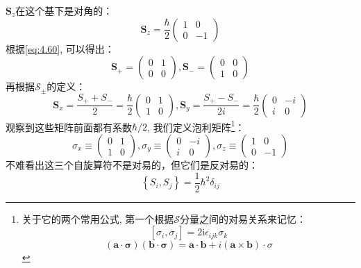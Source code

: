 \documentclass[a4paper,zihao=-4,linespread=1]{ctexrep}
\newenvironment{lequation}{\large\begin{equation}}{\end{equation}}
\begin{document}
    $\mathbf{S}_z$在这个基下是对角的：
    \begin{equation}
    \mathbf{S}_z = \frac{\hbar }{2} \begin{pmatrix}
        1& 0\\
        0& -1
    \end{pmatrix}
    \end{equation}
    根据\ref{eq:4.60}, 可以得出：
    \begin{equation}
        \mathbf{S}_+=\begin{pmatrix}
            0&1\\
            0&0
        \end{pmatrix},
        \mathbf{S}_-=\begin{pmatrix}
            0&0\\
            1&0
        \end{pmatrix}
    \end{equation}
    再根据$\mathcal{S}_\pm$的定义：
    \begin{equation}
        \mathbf{S}_x=\frac{S_++S_-}{2}=\frac{\hbar}{2}
        \begin{pmatrix}
            0&1\\
            1&0
        \end{pmatrix},
        \mathbf{S}_y=\frac{S_+-S_-}{2i}=\frac{\hbar}{2}
        \begin{pmatrix}
            0&-i\\
            i&0
        \end{pmatrix}
    \end{equation}
    观察到这些矩阵前面都有系数$\hbar/2$, 我们定义泡利矩阵\footnote{关于它的两个常用公式, 第一个根据$\mathcal{S}$分量之间的对易关系来记忆：
    \[\left[\sigma_i,\sigma_j\right]=2\mathrm{i}\epsilon_{ijk}\sigma_k\]\[(\mathbf{a} \cdot \boldsymbol{\sigma})(\mathbf{b} \cdot \boldsymbol{\sigma})=\mathbf{a} \cdot \mathbf{b}+i(\mathbf{a} \times \mathbf{b}) \cdot \sigma\]}：
    \begin{lequation}
        \boxed{
            \sigma_x\equiv\begin{pmatrix}
                0&1\\
                1&0
            \end{pmatrix},
            \sigma_y\equiv\begin{pmatrix}
                0&-i\\
                i&0
            \end{pmatrix},
            \sigma_z\equiv\begin{pmatrix}
                1&0\\
                0&-1
            \end{pmatrix}
        }
    \end{lequation}
	不难看出这三个自旋算符不是对易的，但它们是反对易的：
	\[\boxed{\left\{S_i,S_j\right\}=\frac{1}{2}\hbar^2\delta_{ij}}\]
	
\end{document}
